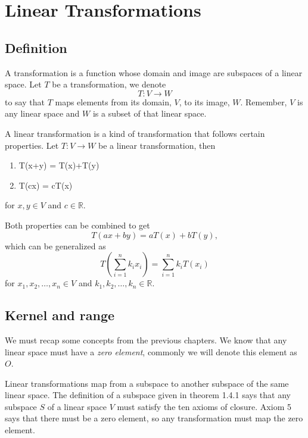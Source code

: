 \documentclass[../linear-spaces.tex]{subfiles}
\begin{document}
\chapter{Linear Transformations}

\section{Definition}
A transformation is a function whose domain and image are subspaces of a linear
space. Let $T$ be a transformation, we denote
\begin{equation}
    T: V \to W
\end{equation}
to say that $T$ maps
elements from its domain, $V$, to its image, $W$. Remember, $V$ is any linear space and $W$ is a
subset of that linear space.

A linear transformation is a kind of transformation that follows certain
properties. Let $T: V\to W$ be a linear transformation, then
\begin{enumerate}
    \item T(x+y) = T(x)+T(y)
    \item T(cx) = cT(x)
\end{enumerate}
for $x,y\in V$ and $c\in \mathbb{R}$.

Both properties can be combined to get
\begin{equation*}
    T(ax+by) = aT(x)+bT(y),
\end{equation*}
which can be generalized as
\begin{equation}
    T\left(\sum_{i=1}^{n}{k_i x_i}\right) = \sum_{i=1}^{n}{k_i T(x_i)}
\end{equation}
for $x_1,x_2,\dots, x_n\in V$ and $k_1,k_2,\dots,k_n \in \mathbb{R}$.

\section{Kernel and range}

We must recap some concepts from the previous chapters. We know that any linear
space must have a \textit{zero element}, commonly we will denote this element
as $O$.

Linear transformations map from a subspace to another subspace of the same
linear space. The definition of a subspace given in theorem 1.4.1 says that any
subspace $S$ of a linear space $V$ must satisfy the ten axioms of closure.
Axiom 5 says that there must be a zero element, so any transformation must map
the zero element.
\end{document}
